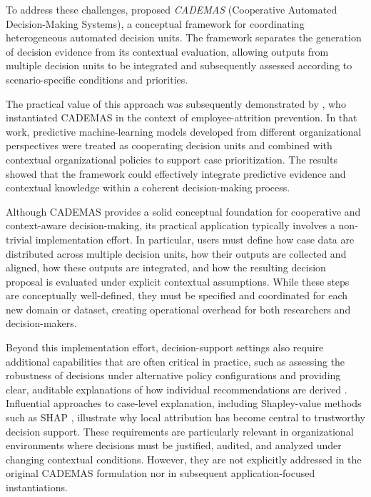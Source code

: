 \documentclass{interact}
\begin{document}
To address these challenges, \citet{NovoaHernandez2026} proposed \textit{CADEMAS} (Cooperative Automated Decision-Making Systems), a conceptual framework for coordinating heterogeneous automated decision units. The framework separates the generation of decision evidence from its contextual evaluation, allowing outputs from multiple decision units to be integrated and subsequently assessed according to scenario-specific conditions and priorities.

The practical value of this approach was subsequently demonstrated by \citet{Godz2026}, who instantiated CADEMAS in the context of employee-attrition prevention. In that work, predictive machine-learning models developed from different organizational perspectives were treated as cooperating decision units and combined with contextual organizational policies to support case prioritization. The results showed that the framework could effectively integrate predictive evidence and contextual knowledge within a coherent decision-making process.

Although CADEMAS provides a solid conceptual foundation for cooperative and context-aware decision-making, its practical application typically involves a non-trivial implementation effort. In particular, users must define how case data are distributed across multiple decision units, how their outputs are collected and aligned, how these outputs are integrated, and how the resulting decision proposal is evaluated under explicit contextual assumptions. While these steps are conceptually well-defined, they must be specified and coordinated for each new domain or dataset, creating operational overhead for both researchers and decision-makers.

Beyond this implementation effort, decision-support settings also require additional capabilities that are often critical in practice, such as assessing the robustness of decisions under alternative policy configurations and providing clear, auditable explanations of how individual recommendations are derived \citep{Arrieta2020}. Influential approaches to case-level explanation, including Shapley-value methods such as SHAP \citep{Lundberg2017,Li2024}, illustrate why local attribution has become central to trustworthy decision support. These requirements are particularly relevant in organizational environments where decisions must be justified, audited, and analyzed under changing contextual conditions. However, they are not explicitly addressed in the original CADEMAS formulation nor in subsequent application-focused instantiations.
\end{document}

